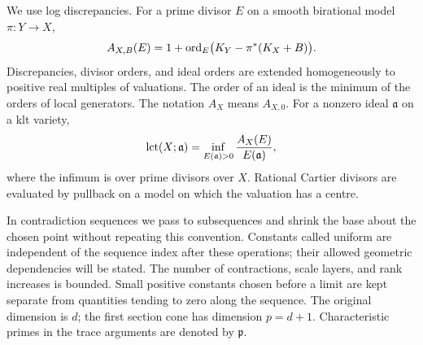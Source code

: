 We use log discrepancies. For a prime divisor $E$ on a smooth birational model
$\pi\colon Y\to X$,
\[
 A_{X,B}(E)=1+\operatorname{ord}_E\bigl(K_Y-\pi^*(K_X+B)\bigr).
\]
Discrepancies, divisor orders, and ideal orders are extended homogeneously to
positive real multiples of valuations. The order of an ideal is the minimum
of the orders of local generators. The notation $A_X$ means $A_{X,0}$.
For a nonzero ideal $\mathfrak a$ on a klt variety,
\[
 \operatorname{lct}(X;\mathfrak a)=
 \inf_{E(\mathfrak a)>0}\frac{A_X(E)}{E(\mathfrak a)},
\]
where the infimum is over prime divisors over $X$. Rational Cartier divisors
are evaluated by pullback on a model on which the valuation has a centre.

In contradiction sequences we pass to subsequences and shrink the base about
the chosen point without repeating this convention. Constants called uniform
are independent of the sequence index after these operations; their allowed
geometric dependencies will be stated. The number of contractions, scale
layers, and rank increases is bounded. Small positive constants chosen before
a limit are kept separate from quantities tending to zero along the sequence.
The original dimension is $d$; the first section cone has dimension $p=d+1$.
Characteristic primes in the trace arguments are denoted by $\mathfrak p$.
